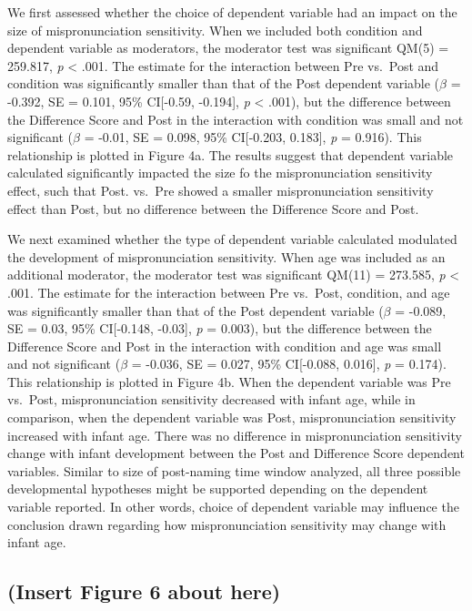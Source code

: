 \documentclass[man]{apa6}
\theoremstyle{definition}
\theoremstyle{definition}
\theoremstyle{definition}
\theoremstyle{remark}
\begin{document}
We first assessed whether the choice of dependent variable had an impact
on the size of mispronunciation sensitivity. When we included both
condition and dependent variable as moderators, the moderator test was
significant QM(5) = 259.817, \emph{p} \textless{} .001. The estimate for
the interaction between Pre vs.~Post and condition was significantly
smaller than that of the Post dependent variable (\(\beta\) = -0.392, SE
= 0.101, 95\% CI{[}-0.59, -0.194{]}, \emph{p} \textless{} .001), but the
difference between the Difference Score and Post in the interaction with
condition was small and not significant (\(\beta\) = -0.01, SE = 0.098,
95\% CI{[}-0.203, 0.183{]}, \emph{p} = 0.916). This relationship is
plotted in Figure 4a. The results suggest that dependent variable
calculated significantly impacted the size fo the mispronunciation
sensitivity effect, such that Post. vs.~Pre showed a smaller
mispronunciation sensitivity effect than Post, but no difference between
the Difference Score and Post.

We next examined whether the type of dependent variable calculated
modulated the development of mispronunciation sensitivity. When age was
included as an additional moderator, the moderator test was significant
QM(11) = 273.585, \emph{p} \textless{} .001. The estimate for the
interaction between Pre vs.~Post, condition, and age was significantly
smaller than that of the Post dependent variable (\(\beta\) = -0.089, SE
= 0.03, 95\% CI{[}-0.148, -0.03{]}, \emph{p} = 0.003), but the
difference between the Difference Score and Post in the interaction with
condition and age was small and not significant (\(\beta\) = -0.036, SE
= 0.027, 95\% CI{[}-0.088, 0.016{]}, \emph{p} = 0.174). This
relationship is plotted in Figure 4b. When the dependent variable was
Pre vs.~Post, mispronunciation sensitivity decreased with infant age,
while in comparison, when the dependent variable was Post,
mispronunciation sensitivity increased with infant age. There was no
difference in mispronunciation sensitivity change with infant
development between the Post and Difference Score dependent variables.
Similar to size of post-naming time window analyzed, all three possible
developmental hypotheses might be supported depending on the dependent
variable reported. In other words, choice of dependent variable may
influence the conclusion drawn regarding how mispronunciation
sensitivity may change with infant age.

\subsection{(Insert Figure 6 about
here)}\label{insert-figure-6-about-here}
\end{document}
